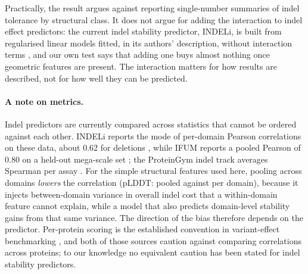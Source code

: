 \documentclass[11pt]{article}
\begin{document}
Practically, the result argues against reporting single-number summaries of indel tolerance by
structural class. It does not argue for adding the interaction to indel effect predictors: the
current indel stability predictor, INDELi, is built from regularised linear models fitted, in its
authors' description, without interaction terms \citep{topolska2025}, and our own test says that
adding one buys almost nothing once geometric features are present. The interaction matters for
how results are described, not for how well they can be predicted.

\paragraph{A note on metrics.} Indel predictors are currently compared across statistics that
cannot be ordered against each other. INDELi reports the mode of per-domain Pearson correlations
on these data, about 0.62 for deletions \citep{topolska2025}, while IFUM reports a pooled Pearson
of 0.80 on a held-out mega-scale set \citep{lee2026}; the ProteinGym indel track averages Spearman
per assay \citep{notin2023}. For the simple structural features used here, pooling across domains
\emph{lowers} the correlation (pLDDT: \PooledR{} pooled against \PerDomR{} per domain), because it
injects between-domain variance in overall indel cost that a within-domain feature cannot explain,
while a model that also predicts domain-level stability gains from that same variance. The
direction of the bias therefore depends on the predictor. Per-protein scoring is the established
convention in variant-effect benchmarking \citep{livesey2025,notin2023}, and both of those sources
caution against comparing correlations across proteins; to our knowledge no equivalent caution has
been stated for indel stability predictors.
\end{document}
